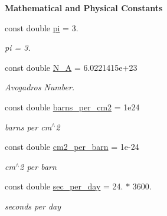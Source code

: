 \begin{Indent}\textbf{ Mathematical and Physical Constants}\par
\begin{DoxyCompactItemize}
\item 
\mbox{\label{namespacepyne_a3b91aba14e56f740dc75b78b9eba037a}} 
const double \hyperlink{namespacepyne_a3b91aba14e56f740dc75b78b9eba037a}{pi} = 3.
\begin{DoxyCompactList}\small\item\em pi = 3. \end{DoxyCompactList}\item 
\mbox{\label{namespacepyne_a44461c2367af5fc9b6bb0988aac2429b}} 
const double \hyperlink{namespacepyne_a44461c2367af5fc9b6bb0988aac2429b}{N\+\_\+A} = 6.\+0221415e+23
\begin{DoxyCompactList}\small\item\em Avogadro\textquotesingle{}s Number. \end{DoxyCompactList}\item 
\mbox{\label{namespacepyne_ad475cf6f124859f735f6d93ec206ec0d}} 
const double \hyperlink{namespacepyne_ad475cf6f124859f735f6d93ec206ec0d}{barns\+\_\+per\+\_\+cm2} = 1e24
\begin{DoxyCompactList}\small\item\em barns per cm$^\wedge$2 \end{DoxyCompactList}\item 
\mbox{\label{namespacepyne_a0706fc6ba35f0c6f85cea550344c1815}} 
const double \hyperlink{namespacepyne_a0706fc6ba35f0c6f85cea550344c1815}{cm2\+\_\+per\+\_\+barn} = 1e-\/24
\begin{DoxyCompactList}\small\item\em cm$^\wedge$2 per barn \end{DoxyCompactList}\item 
\mbox{\label{namespacepyne_a3a54f183e7323b4d62c12f309c3af081}} 
const double \hyperlink{namespacepyne_a3a54f183e7323b4d62c12f309c3af081}{sec\+\_\+per\+\_\+day} = 24. $\ast$ 3600.
\begin{DoxyCompactList}\small\item\em seconds per day \end{DoxyCompactList}\item 

\end{DoxyCompactItemize}
\end{Indent}
